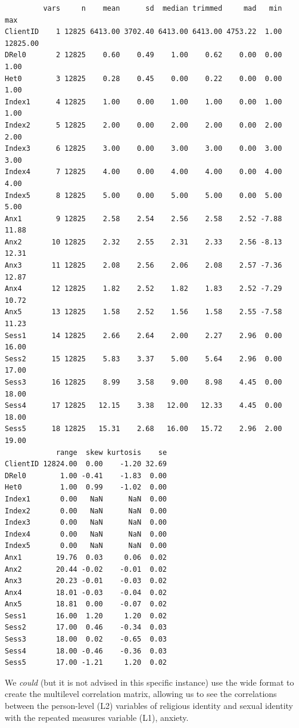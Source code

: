 \documentclass[
  11pt,
]{book}
\begin{document}
\begin{verbatim}
         vars     n    mean      sd  median trimmed     mad   min      max
ClientID    1 12825 6413.00 3702.40 6413.00 6413.00 4753.22  1.00 12825.00
DRel0       2 12825    0.60    0.49    1.00    0.62    0.00  0.00     1.00
Het0        3 12825    0.28    0.45    0.00    0.22    0.00  0.00     1.00
Index1      4 12825    1.00    0.00    1.00    1.00    0.00  1.00     1.00
Index2      5 12825    2.00    0.00    2.00    2.00    0.00  2.00     2.00
Index3      6 12825    3.00    0.00    3.00    3.00    0.00  3.00     3.00
Index4      7 12825    4.00    0.00    4.00    4.00    0.00  4.00     4.00
Index5      8 12825    5.00    0.00    5.00    5.00    0.00  5.00     5.00
Anx1        9 12825    2.58    2.54    2.56    2.58    2.52 -7.88    11.88
Anx2       10 12825    2.32    2.55    2.31    2.33    2.56 -8.13    12.31
Anx3       11 12825    2.08    2.56    2.06    2.08    2.57 -7.36    12.87
Anx4       12 12825    1.82    2.52    1.82    1.83    2.52 -7.29    10.72
Anx5       13 12825    1.58    2.52    1.56    1.58    2.55 -7.58    11.23
Sess1      14 12825    2.66    2.64    2.00    2.27    2.96  0.00    16.00
Sess2      15 12825    5.83    3.37    5.00    5.64    2.96  0.00    17.00
Sess3      16 12825    8.99    3.58    9.00    8.98    4.45  0.00    18.00
Sess4      17 12825   12.15    3.38   12.00   12.33    4.45  0.00    18.00
Sess5      18 12825   15.31    2.68   16.00   15.72    2.96  2.00    19.00
            range  skew kurtosis    se
ClientID 12824.00  0.00    -1.20 32.69
DRel0        1.00 -0.41    -1.83  0.00
Het0         1.00  0.99    -1.02  0.00
Index1       0.00   NaN      NaN  0.00
Index2       0.00   NaN      NaN  0.00
Index3       0.00   NaN      NaN  0.00
Index4       0.00   NaN      NaN  0.00
Index5       0.00   NaN      NaN  0.00
Anx1        19.76  0.03     0.06  0.02
Anx2        20.44 -0.02    -0.01  0.02
Anx3        20.23 -0.01    -0.03  0.02
Anx4        18.01 -0.03    -0.04  0.02
Anx5        18.81  0.00    -0.07  0.02
Sess1       16.00  1.20     1.20  0.02
Sess2       17.00  0.46    -0.34  0.03
Sess3       18.00  0.02    -0.65  0.03
Sess4       18.00 -0.46    -0.36  0.03
Sess5       17.00 -1.21     1.20  0.02
\end{verbatim}

We \emph{could} (but it is not advised in this specific instance) use the wide format to create the multilevel correlation matrix, allowing us to see the correlations between the person-level (L2) variables of religious identity and sexual identity with the repeated measures variable (L1), anxiety.
\end{document}
